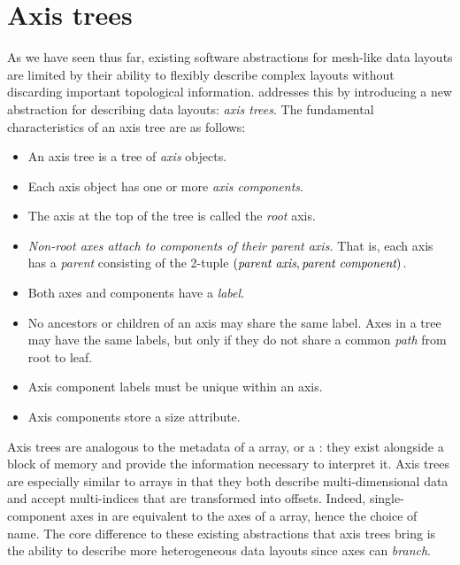 \documentclass[thesis]{subfiles}
\begin{document}
\chapter{Axis trees}
\label{chapter:axis_trees}

As we have seen thus far, existing software abstractions for mesh-like data layouts are limited by their ability to flexibly describe complex layouts without discarding important topological information.
 addresses this by introducing a new abstraction for describing data layouts: \emph{axis trees}.
The fundamental characteristics of an axis tree are as follows:

\begin{itemize}
  \item
    An axis tree is a tree of \emph{axis} objects.

  \item
    Each axis object has one or more \emph{axis components}.

  \item
    The axis at the top of the tree is called the \emph{root} axis.

  \item
    \emph{Non-root axes attach to components of their parent axis.}
    That is, each axis has a \emph{parent} consisting of the 2-tuple $(\textnormal{\it parent axis}, \textnormal{\it parent component})$.

  \item
    Both axes and components have a \emph{label}.

  \item
    No ancestors or children of an axis may share the same label.
    Axes in a tree may have the same labels, but only if they do not share a common \emph{path} from root to leaf.

  \item
    Axis component labels must be unique within an axis.

  \item
    Axis components store a size attribute.
\end{itemize}


Axis trees are analogous to the metadata of a \numpy array, or a  : they exist alongside a block of memory and provide the information necessary to interpret it.
Axis trees are especially similar to \numpy arrays in that they both describe multi-dimensional data and accept multi-indices that are transformed into offsets.
Indeed, single-component axes in  are equivalent to the axes of a \numpy array, hence the choice of name.
The core difference to these existing abstractions that axis trees bring is the ability to describe more heterogeneous data layouts since axes can \emph{branch}.
\end{document}
